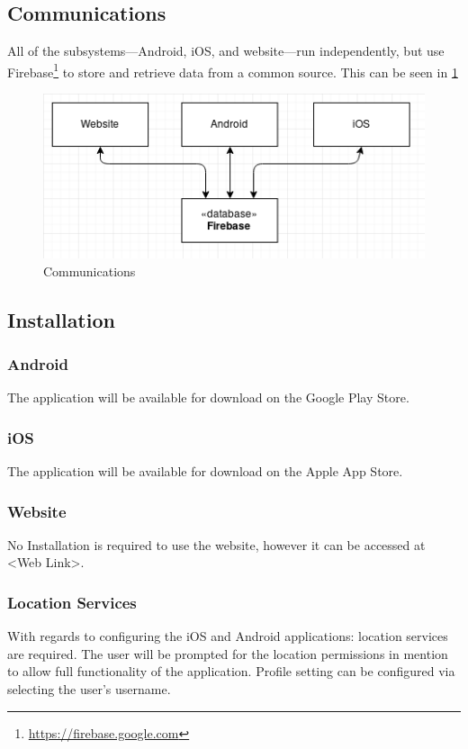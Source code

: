 \documentclass[11pt]{article}
\begin{document}
\subsection{Communications}
All of the subsystems---Android, iOS, and website---run independently, but use Firebase\footnote{\url{https://firebase.google.com}} to store and retrieve data from a common source. This can be seen in \ref{Communications}

\begin{figure}
 \centering
 \includegraphics[width=12cm, keepaspectratio]{Images/Communications.png}
 \caption{Communications}
 \label{Communications}
\end{figure}

\subsection{Installation}
\subsubsection{Android}
The application will be available for download on the Google Play Store.
\subsubsection{iOS}
The application will be available for download on the Apple App Store.
\subsubsection{Website}
No Installation is required to use the website, however it can be accessed at <Web Link>.
\subsubsection{Location Services}
With regards to configuring the iOS and Android applications: location services are required. The user will be prompted for the location permissions in mention to allow full functionality of the application. Profile setting can be configured via selecting the user's username.
\end{document}
